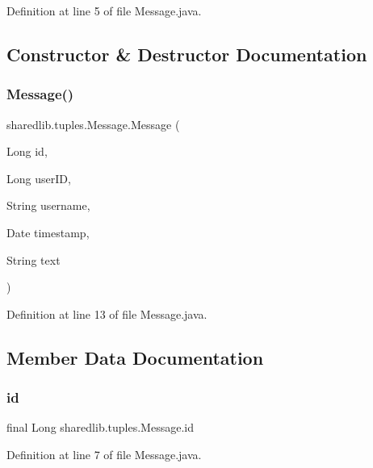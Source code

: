 Definition at line 5 of file Message.\+java.



\subsection{Constructor \& Destructor Documentation}
\hypertarget{classsharedlib_1_1tuples_1_1_message_a6adc6c69ccb5ee797eeb41ed04f7f35a}{}\label{classsharedlib_1_1tuples_1_1_message_a6adc6c69ccb5ee797eeb41ed04f7f35a} 
\subsubsection{\texorpdfstring{Message()}{Message()}}
{\footnotesize\ttfamily sharedlib.\+tuples.\+Message.\+Message (\begin{DoxyParamCaption}\item[{Long}]{id,  }\item[{Long}]{user\+ID,  }\item[{String}]{username,  }\item[{Date}]{timestamp,  }\item[{String}]{text }\end{DoxyParamCaption})}



Definition at line 13 of file Message.\+java.



\subsection{Member Data Documentation}
\hypertarget{classsharedlib_1_1tuples_1_1_message_a0f04f43067e7ff168c591a1599a533bb}{}\label{classsharedlib_1_1tuples_1_1_message_a0f04f43067e7ff168c591a1599a533bb} 
\subsubsection{\texorpdfstring{id}{id}}
{\footnotesize\ttfamily final Long sharedlib.\+tuples.\+Message.\+id}



Definition at line 7 of file Message.\+java.

